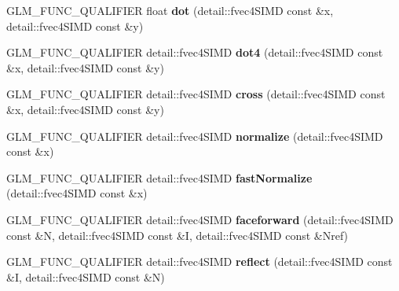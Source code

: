 \begin{DoxyCompactItemize}
\item 
G\+L\+M\+\_\+\+F\+U\+N\+C\+\_\+\+Q\+U\+A\+L\+I\+F\+I\+ER float {\bfseries dot} (detail\+::fvec4\+S\+I\+MD const \&x, detail\+::fvec4\+S\+I\+MD const \&y)\hypertarget{namespaceglm_ae84ca0b0e48c6a79faac0eea8bc7a913}{}\label{namespaceglm_ae84ca0b0e48c6a79faac0eea8bc7a913}

\item 
G\+L\+M\+\_\+\+F\+U\+N\+C\+\_\+\+Q\+U\+A\+L\+I\+F\+I\+ER detail\+::fvec4\+S\+I\+MD {\bfseries dot4} (detail\+::fvec4\+S\+I\+MD const \&x, detail\+::fvec4\+S\+I\+MD const \&y)\hypertarget{namespaceglm_af55916a3764adaa7537f5e3e9ccacb81}{}\label{namespaceglm_af55916a3764adaa7537f5e3e9ccacb81}

\item 
G\+L\+M\+\_\+\+F\+U\+N\+C\+\_\+\+Q\+U\+A\+L\+I\+F\+I\+ER detail\+::fvec4\+S\+I\+MD {\bfseries cross} (detail\+::fvec4\+S\+I\+MD const \&x, detail\+::fvec4\+S\+I\+MD const \&y)\hypertarget{namespaceglm_a06a52dedca29da951493c4c6f6020573}{}\label{namespaceglm_a06a52dedca29da951493c4c6f6020573}

\item 
G\+L\+M\+\_\+\+F\+U\+N\+C\+\_\+\+Q\+U\+A\+L\+I\+F\+I\+ER detail\+::fvec4\+S\+I\+MD {\bfseries normalize} (detail\+::fvec4\+S\+I\+MD const \&x)\hypertarget{namespaceglm_aabe6e7b8dbd2e5db215f973e474dd951}{}\label{namespaceglm_aabe6e7b8dbd2e5db215f973e474dd951}

\item 
G\+L\+M\+\_\+\+F\+U\+N\+C\+\_\+\+Q\+U\+A\+L\+I\+F\+I\+ER detail\+::fvec4\+S\+I\+MD {\bfseries fast\+Normalize} (detail\+::fvec4\+S\+I\+MD const \&x)\hypertarget{namespaceglm_a28640ee202fdb12ef3e836c257675043}{}\label{namespaceglm_a28640ee202fdb12ef3e836c257675043}

\item 
G\+L\+M\+\_\+\+F\+U\+N\+C\+\_\+\+Q\+U\+A\+L\+I\+F\+I\+ER detail\+::fvec4\+S\+I\+MD {\bfseries faceforward} (detail\+::fvec4\+S\+I\+MD const \&N, detail\+::fvec4\+S\+I\+MD const \&I, detail\+::fvec4\+S\+I\+MD const \&Nref)\hypertarget{namespaceglm_ae3d9637fb22cf7eecd448c5ad341efab}{}\label{namespaceglm_ae3d9637fb22cf7eecd448c5ad341efab}

\item 
G\+L\+M\+\_\+\+F\+U\+N\+C\+\_\+\+Q\+U\+A\+L\+I\+F\+I\+ER detail\+::fvec4\+S\+I\+MD {\bfseries reflect} (detail\+::fvec4\+S\+I\+MD const \&I, detail\+::fvec4\+S\+I\+MD const \&N)\hypertarget{namespaceglm_aca05cfddf931415f023b4ac91b96d739}{}\label{namespaceglm_aca05cfddf931415f023b4ac91b96d739}


\end{DoxyCompactItemize}
